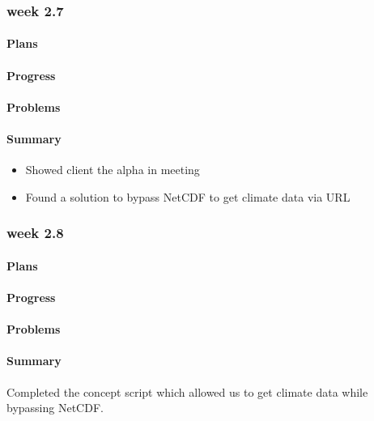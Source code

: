 \documentclass[onecolumn, draftclsnofoot,10pt, compsoc]{article}
\begin{document}
		\subsubsection{week 2.7}
			\paragraph{Plans} \hfill \break
		    \paragraph{Progress} \hfill \break
			\paragraph{Problems} \hfill \break
			\paragraph{Summary} \hfill \break
				\begin{itemize}
                    \item Showed client the alpha in meeting
                    \item Found a solution to bypass NetCDF to get climate data via URL
                \end{itemize}

		\subsubsection{week 2.8}
			\paragraph{Plans} \hfill \break

			\paragraph{Progress} \hfill \break

			\paragraph{Problems} \hfill \break

			\paragraph{Summary} \hfill \break
			    Completed the concept script which allowed us to get climate data while bypassing NetCDF.
\end{document}

